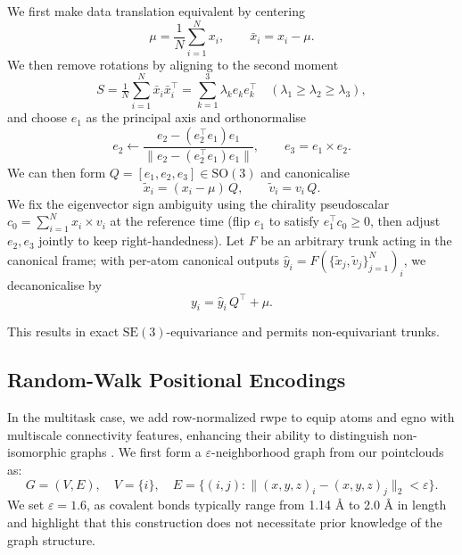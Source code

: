 We first make data translation equivalent by centering
\begin{equation}
    \mu = \frac{1}{N}\sum_{i=1}^N x_i,
    \qquad
    \bar x_i = x_i - \mu.
\end{equation}
We then remove rotations by aligning to the second moment
\begin{equation}
    S = \tfrac{1}{N}\sum_{i=1}^N \bar x_i \bar x_i^\top
    = \sum_{k=1}^3 \lambda_k e_k e_k^\top
    \quad (\lambda_1 \ge \lambda_2 \ge \lambda_3),
\end{equation}
and choose \(e_1\) as the principal axis and orthonormalise
\begin{equation}
e_2 \leftarrow \frac{e_2 - (e_2^\top e_1)e_1}{\|e_2 - (e_2^\top e_1)e_1\|}, \qquad e_3  = e_1 \times e_2.
\end{equation}
We can then form \(Q = [e_1, e_2, e_3] \in \mathrm{SO}(3)\) and canonicalise
\begin{equation}
    \tilde x_i = (x_i-\mu)\,Q,\qquad \tilde v_i = v_i\,Q.
\end{equation}
We fix the eigenvector sign ambiguity using the chirality pseudoscalar \(c_0=\sum_{i=1}^N x_i\times v_i\) at the reference time (flip \(e_1\) to satisfy \(e_1^\top c_0\ge 0\), then adjust \(e_2,e_3\) jointly to keep right-handedness).
Let \(F\) be an arbitrary trunk acting in the canonical frame; with per-atom canonical outputs \(\hat y_i=F(\{\tilde x_j,\tilde v_j\}_{j=1}^N)_i\), we decanonicalise by
\begin{equation}
    y_i=\hat y_i\,Q^\top+\mu.
\end{equation}

This results in exact \(\mathrm{SE}(3)\)-equivariance \citep{kaba_equivariance_2023} and permits non-equivariant trunks.

\subsection{Random-Walk Positional Encodings}
\label{sec:positional_encoding}
In the multitask case, we add row-normalized \gls{rwpe} to equip \gls{atoms} and \gls{egno} with multiscale connectivity features, enhancing their ability to distinguish non-isomorphic graphs \cite{dwivedi_graph_2022, ma_graph_2023}. We first form a \(\varepsilon\)-neighborhood graph from our pointclouds as:
\begin{equation}
    G = (V,E), \quad V = \{i\}, \quad E = \{(i,j): \|(x,y,z)_i-(x,y,z)_j\|_2 < \varepsilon\}.
\end{equation}
We set \(\varepsilon = 1.6\), as covalent bonds typically range from 1.14 \AA{} to 2.0 \AA{} in length \cite{lobato_highs_2021} and highlight that this construction does not necessitate prior knowledge of the graph structure.

